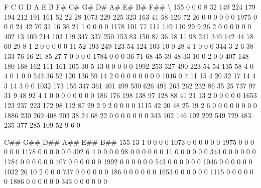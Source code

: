 \documentclass[letterpaper,10pt,english]{sphinxmanual}
\begin{document}
{\begin{sphinxVerbatim}[commandchars=\\\{\}]
        F    C    G    D    A    E    B   F\#   C\#   G\#   D\#   A\#  E\#  B\#  F\#\#  \textbackslash{}
155     0    0    0    8   32  149  224  179  194  212  191  161  52  22   28
1073  229  225  323  163   41   58  126   72   26    0    0    0   0   0    0
1975    0    0    0   24   42   70   31   16   36   21    1    0   0   0    0
1178  101   77  111  149  110   29    9   26    2    0    0    0   0   0    0
402    13  100  214  103  179  347  337  250  153   83  150   87  36  18   11
98    241  340  142   44   78   60   29    8    1    2    0    0   0   0    0
11     52  193  249  123   54  124  103   10    0   28    4    1   0   0    0
344     3    2    6   38  133   76   16   21   85   27    7    0   0   0    0
1784    0    0    0   36   71   68   45   39   48   33   10    0   2   0    0
407   148  180  168  162  111  161  105   30    5   13    0    0   0   0    0
1992  253  327  490  223   54   54  135   58    4    0    4    0   1   0    0
543    36   52  120  136   59   14    2    0    0    0    0    0   0   0    0
1046    0    7   11   15    4   20   32   17   14    4    3   14   3   0    0
1032  173  155  347  361  401  499  530  626  491  263  262  232  86  35   25
737    97   31    9   48   92    4    1    0    0    0    0    0   0   0    0
186   176  198  138   97  128   88   41   21   13    2    0    0   0   0    0
1653  123  237  223  172   98  112   87   29    2    9    2    0   0   0    0
1115   42   20   48   25   19    2    6    0    0    0    0    0   0   0    0
1886  230  269  408  203   38   24   68   22    0    0    0    0   0   0    0
343   102  146  102  292  549  729  483  235  377  285  109   52   9   6    0

      C\#\#  G\#\#  D\#\#  A\#\#  E\#\#  B\#\#
155    13    1    0    0    0    0
1073    0    0    0    0    0    0
1975    0    0    0    0    0    0
1178    0    0    0    0    0    0
402     6    4    0    0    0    0
98      0    0    0    0    0    0
11      0    0    0    0    0    0
344     0    0    0    0    0    0
1784    0    0    0    0    0    0
407     0    0    0    0    0    0
1992    0    0    0    0    0    0
543     0    0    0    0    0    0
1046    0    0    0    0    0    0
1032   26   10    2    0    0    0
737     0    0    0    0    0    0
186     0    0    0    0    0    0
1653    0    0    0    0    0    0
1115    0    0    0    0    0    0
1886    0    0    0    0    0    0
343     0    0    0    0    0    0
\end{sphinxVerbatim}
}
\end{document}
